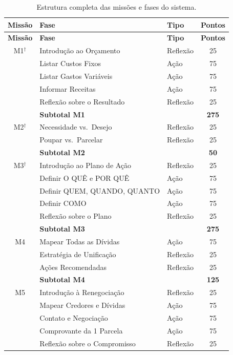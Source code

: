 \begin{longtable}{cllc}
\caption{Estrutura completa das missões e fases do sistema.} \label{tab:missoes_completa} \\
\hline
\textbf{Missão} & \textbf{Fase} & \textbf{Tipo} & \textbf{Pontos} \\
\hline
\endfirsthead
\hline
\textbf{Missão} & \textbf{Fase} & \textbf{Tipo} & \textbf{Pontos} \\
\hline
\endhead
\hline
\endfoot
M1$^{\dagger}$ & Introdução ao Orçamento & Reflexão & 25 \\
   & Listar Custos Fixos & Ação & 75 \\
   & Listar Gastos Variáveis & Ação & 75 \\
   & Informar Receitas & Ação & 75 \\
   & Reflexão sobre o Resultado & Reflexão & 25 \\
\hline
   & \textbf{Subtotal M1} & & \textbf{275} \\
\hline
M2$^{\dagger}$ & Necessidade vs.\ Desejo & Reflexão & 25 \\
   & Poupar vs.\ Parcelar & Reflexão & 25 \\
\hline
   & \textbf{Subtotal M2} & & \textbf{50} \\
\hline
M3$^{\dagger}$ & Introdução ao Plano de Ação & Reflexão & 25 \\
   & Definir O QUÊ e POR QUÊ & Ação & 75 \\
   & Definir QUEM, QUANDO, QUANTO & Ação & 75 \\
   & Definir COMO & Ação & 75 \\
   & Reflexão sobre o Plano & Reflexão & 25 \\
\hline
   & \textbf{Subtotal M3} & & \textbf{275} \\
\hline
M4 & Mapear Todas as Dívidas & Ação & 75 \\
   & Estratégia de Unificação & Reflexão & 25 \\
   & Ações Recomendadas & Reflexão & 25 \\
\hline
   & \textbf{Subtotal M4} & & \textbf{125} \\
\hline
M5 & Introdução à Renegociação & Reflexão & 25 \\
   & Mapear Credores e Dívidas & Ação & 75 \\
   & Contato e Negociação & Ação & 75 \\
   & Comprovante da 1\textordfeminine{} Parcela & Ação & 75 \\
   & Reflexão sobre o Compromisso & Reflexão & 25 \\

\end{longtable}
